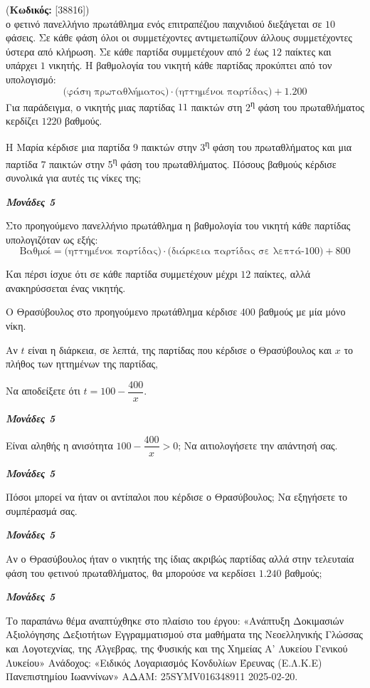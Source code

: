 \documentclass[11pt,a4paper,twoside]{book}
\newcounter{askhsh}[chapter]
\renewcommand{\theaskhsh}{
	\bf{\titlefont{\Large{\thechapter}}.\arabic{askhsh}}
}
\newcommand{\Askhsh}[2]{\refstepcounter{askhsh}{\titlefont{Άσκηση\theaskhsh} - \textcolor{maincolor}{ΘΕΜΑ #2}} (\small{\textbf{Κωδικός:} #1})\\}{}
\newcommand{\monades}[1]{
\hspace*{\fill}
\textbf{\textit{\textcolor{maincolor}{Μονάδες #1}}}}
\begin{document}
\vspace{4mm}

\Askhsh{[38816]}
Το φετινό πανελλήνιο πρωτάθλημα ενός επιτραπέζιου παιχνιδιού διεξάγεται σε $10$ φάσεις. Σε κάθε φάση όλοι οι συμμετέχοντες αντιμετωπίζουν άλλους συμμετέχοντες ύστερα από κλήρωση. Σε κάθε παρτίδα συμμετέχουν από $2$ έως $12$ παίκτες και υπάρχει $1$ νικητής. Η βαθμολογία του νικητή κάθε παρτίδας προκύπτει από τον υπολογισμό:
\[\text{(φάση πρωταθλήματος)}\cdot\text{(ηττημένοι παρτίδας)}+1.200\]
Για παράδειγμα, ο νικητής μιας παρτίδας $11$ παικτών στη 2\textsuperscript{η} φάση του πρωταθλήματος κερδίζει $1220$ βαθμούς.
\begin{alist}
\item Η Μαρία κέρδισε μια παρτίδα 9 παικτών στην 3\textsuperscript{η} φάση του πρωταθλήματος και μια παρτίδα 7 παικτών στην 5\textsuperscript{η} φάση του πρωταθλήματος. Πόσους βαθμούς κέρδισε συνολικά για αυτές τις νίκες της;
\monades{5}
\item Στο προηγούμενο πανελλήνιο πρωτάθλημα η βαθμολογία του νικητή κάθε παρτίδας υπολογιζόταν ως εξής:
\[\text{Βαθμοί}=\text{(ηττημένοι παρτίδας)}\cdot\text{(διάρκεια παρτίδας σε λεπτά-100)}+800\]

Και πέρσι ίσχυε ότι σε κάθε παρτίδα συμμετέχουν μέχρι $12$ παίκτες, αλλά ανακηρύσσεται ένας νικητής.

Ο Θρασύβουλος στο προηγούμενο πρωτάθλημα κέρδισε $400$ βαθμούς με μία μόνο νίκη.

Αν $t$ είναι η διάρκεια, σε λεπτά, της παρτίδας που κέρδισε ο Θρασύβουλος και $x$ το πλήθος των ηττημένων της παρτίδας,

\begin{rlist}
\item Να αποδείξετε ότι $t = 100 - \dfrac{400}{x}$.
\monades{5}
\item Είναι αληθής η ανισότητα $100 - \dfrac{400}{x} > 0$; Να αιτιολογήσετε την απάντησή σας.
\monades{5}
\item Πόσοι μπορεί να ήταν οι αντίπαλοι που κέρδισε ο Θρασύβουλος; Να εξηγήσετε το συμπέρασμά σας.
\monades{5}
\item Αν ο Θρασύβουλος ήταν ο νικητής της ίδιας ακριβώς παρτίδας αλλά στην τελευταία φάση του φετινού πρωταθλήματος, θα μπορούσε να κερδίσει $1.240$ βαθμούς;
\monades{5}

{\footnotesize Το παραπάνω θέμα αναπτύχθηκε στο πλαίσιο του έργου: «Ανάπτυξη Δοκιμασιών Αξιολόγησης Δεξιοτήτων Εγγραμματισμού στα μαθήματα της Νεοελληνικής Γλώσσας και Λογοτεχνίας, της Άλγεβρας, της Φυσικής και της Χημείας Α' Λυκείου Γενικού Λυκείου» Ανάδοχος: «Ειδικός Λογαριασμός Κονδυλίων Έρευνας (Ε.Λ.Κ.Ε) Πανεπιστημίου Ιωαννίνων» ΑΔΑΜ: 25SYMV016348911 2025-02-20.}
\end{rlist}
\end{alist}
\end{document}

